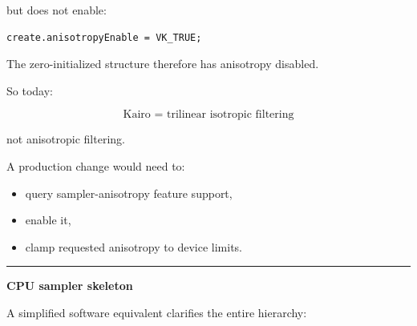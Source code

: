 but does not enable:

\begin{verbatim}
create.anisotropyEnable = VK_TRUE;
\end{verbatim}

The zero-initialized structure therefore has anisotropy disabled.

So today:

\[
\boxed{
\text{Kairo = trilinear isotropic filtering}
}
\]

not anisotropic filtering.

A production change would need to:

\begin{itemize}
\tightlist
\item
  query sampler-anisotropy feature support,
\item
  enable it,
\item
  clamp requested anisotropy to device limits.
\end{itemize}

\begin{center}\rule{0.5\linewidth}{0.5pt}\end{center}

\textbf{CPU sampler skeleton}

A simplified software equivalent clarifies the entire hierarchy:

